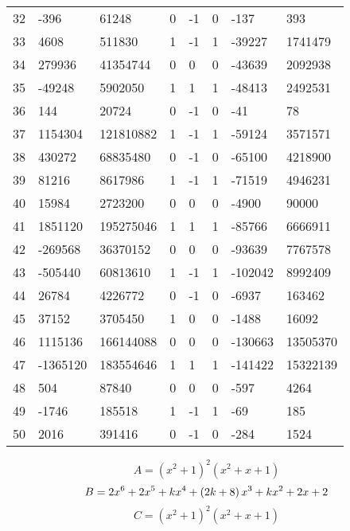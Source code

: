 \documentclass{amsart}
\begin{document}
\begin{longtable}{|l|l|l|lllll|}
32&-396&61248&0&-1&0&-137&393\\
33&4608&511830&1&-1&1&-39227&1741479\\
34&279936&41354744&0&0&0&-43639&2092938\\
35&-49248&5902050&1&1&1&-48413&2492531\\
36&144&20724&0&-1&0&-41&78\\
37&1154304&121810882&1&-1&1&-59124&3571571\\
38&430272&68835480&0&-1&0&-65100&4218900\\
39&81216&8617986&1&-1&1&-71519&4946231\\
40&15984&2723200&0&0&0&-4900&90000\\
41&1851120&195275046&1&1&1&-85766&6666911\\
42&-269568&36370152&0&0&0&-93639&7767578\\
43&-505440&60813610&1&-1&1&-102042&8992409\\
44&26784&4226772&0&-1&0&-6937&163462\\
45&37152&3705450&1&0&0&-1488&16092\\
46&1115136&166144088&0&0&0&-130663&13505370\\
47&-1365120&183554646&1&1&1&-141422&15322139\\
48&504&87840&0&0&0&-597&4264\\
49&-1746&185518&1&-1&1&-69&185\\
50&2016&391416&0&-1&0&-284&1524\\
\hline
\end{longtable}
$$A=(x^2
 + 1)^{2}(x^2
 + x
 + 1)$$
$$B=2\*x^6
 + 2\*x^5
 + k\*x^4
 + \left(2\*k
 + 8\right) \*x^3
 + k\*x^2
 + 2\*x
 + 2$$
$$C=(x^2
 + 1)^{2}(x^2
 + x
 + 1)$$
\end{document}
